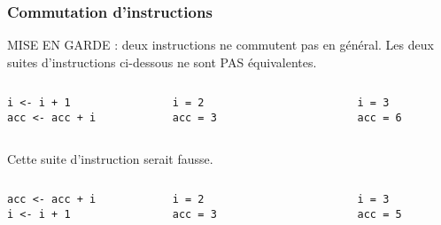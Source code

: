 \documentclass[10pt]{beamer}
\begin{document}
\begin{frame}[fragile]
  \frametitle{Commutation d'instructions}
\begin{alertblock}{MISE EN GARDE : deux instructions ne commutent pas en général.}
  Les deux suites d’instructions ci-dessous ne sont PAS équivalentes. 
\end{alertblock}

  
\begin{columns}[c]
  \begin{column}{0.25\textwidth}
  \begin{lstlisting}[style=editor]
i <- i + 1 
acc <- acc + i 
  \end{lstlisting}
\end{column}
\begin{column}{0.25\textwidth}
  \begin{lstlisting}
i = 2
acc = 3
\end{lstlisting}
\end{column}
\begin{column}{0.1\textwidth}
  \RUN
\end{column}
\begin{column}{0.25\textwidth}
  \begin{lstlisting}
i = 3
acc = 6
\end{lstlisting}
\end{column}
\end{columns}

Cette suite d'instruction serait fausse.
\begin{columns}[c]
  \begin{column}{0.25\textwidth}
  \begin{lstlisting}[style=editor]
acc <- acc + i 
i <- i + 1
\end{lstlisting}
\end{column}
\begin{column}{0.25\textwidth}
  \begin{lstlisting}
i = 2
acc = 3
\end{lstlisting}
\end{column}
\begin{column}{0.1\textwidth}
  \RUN
\end{column}
\begin{column}{0.25\textwidth}
  \begin{lstlisting}
i = 3
acc = 5
\end{lstlisting}
\end{column}
\end{columns}


\end{frame}
\end{document}
